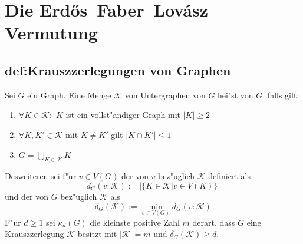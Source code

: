 \section{Die Erd\H{o}s--Faber--Lov\'asz Vermutung}
\label{sec:EFL-Vermutung}


\subsection{def:Krauszzerlegungen von Graphen}
\label{subsec:Krauszzerlegung}
\begin{definition}
    \label{def:Krauszzerlegung}
    Sei $G$ ein Graph. Eine Menge $\mathcal K$ von Untergraphen von $G$ hei"st  von $G$, falls gilt:
    \begin{enumerate}[label=(\roman*)]
        \item $\forall K \in \mathcal K:$ $K$ ist ein vollst"andiger Graph mit $|K| \geq 2$
        \item $\forall K, K'\in \mathcal K$ mit $K\neq K'$ gilt $|K\cap K'| \leq 1$
        \item $G=\bigcup\limits_{K\in \mathcal K}K$
    \end{enumerate}
    Desweiteren sei f"ur $v\in V(G)$ der  von $v$ bez"uglich $\mathcal K$ definiert als $$d_G(v:\mathcal K) := |\{ K\in\mathcal K| v \in V(K)\}|$$ und der  von $G$ bez"uglich $\mathcal K$ als $$\delta_G(\mathcal K) := \min\limits_{v\in V(G)}d_G(v:\mathcal K)$$ 
    F"ur $d \geq 1$ sei $\kappa_d(G)$ die kleinste positive Zahl $m$ derart, dass $G$ eine Krauszzerlegung $\mathcal K$ besitzt mit $|\mathcal K| = m$ und $\delta_G(\mathcal K) \geq d$.
\end{definition}
